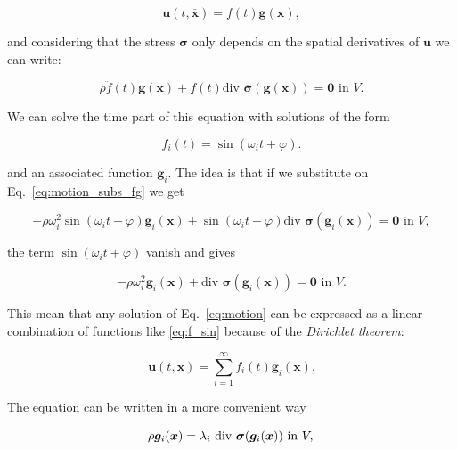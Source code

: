 \documentclass[preprint]{elsarticle}
\begin{document}
\begin{equation}
\bm{u}(t,\overline{\bm{x}}) = f(t) \bm{g}(\bm{x}),
\label{eq:u_fg}
\end{equation}

\noindent
and considering that the stress $\bm{\sigma}$ only depends on the
spatial derivatives of $\bm{u}$ we can write:

\begin{equation}
\rho \ddot{f}(t) \bm{g}(\bm{x}) +
f(t) \text{div } \overline{\bm{\sigma}}(\bm{g}(\bm{x}))
= \bm{0} \text{ in } V.
\label{eq:motion_subs_fg}
\end{equation}

We can solve the time part of this equation with solutions of the form

\begin{equation}
f_i(t) = \sin (\omega_i t + \varphi).
\label{eq:f_sin}
\end{equation}

\noindent
and an associated function $\bm{g}_i$. The idea is that if we substitute 
on Eq.~\ref{eq:motion_subs_fg} we get

\begin{equation}
- \rho \omega_i^2 \sin (\omega_i t + \varphi) \bm{g}_i(\bm{x}) +
\sin (\omega_i t + \varphi) \text{div } \bm{\sigma}(\bm{g}_i(\bm{x})) 
= \bm{0} \text{ in } V,
\label{eq:motion}
\end{equation}

\noindent
the term $\sin (\omega_i t + \varphi)$ vanish and gives

\begin{equation}
- \rho \omega_i^2 \bm{g}_i(\bm{x}) +
\text{div } \bm{\sigma}(\bm{g}_i(\bm{x})) 
= \bm{0} \text{ in } V.
\label{eq:motion}
\end{equation}

This mean that any solution of Eq.~\ref{eq:motion} can be expressed as a linear
combination of functions like \ref{eq:f_sin} because of the \emph{Dirichlet
theorem}:

\begin{equation}
\bm{u}(t,\bm{x}) = \sum_{i=1}^{\infty} f_i(t)
\bm{g}_i(\bm{x}).
\label{eq:dir_teo}
\end{equation}

The equation can be written in a more convenient way

\begin{equation}
\rho \bm{g}_i(\bm{x}) = 
\lambda_i  \text{ div } \bm{\sigma}(\bm{g}_i(\bm{x})) 
\text{ in } V,\\
\label{eq:motion}
\end{equation}
\end{document}
